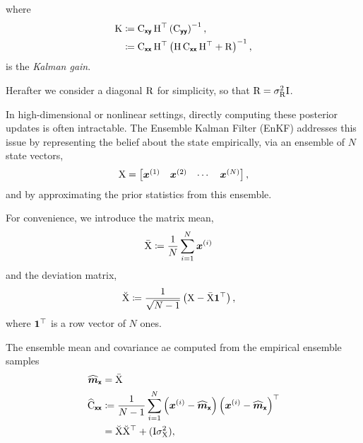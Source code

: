 \documentclass{article}
\begin{document}
where
\begin{align}
\mathrm{K}
&\coloneq \mathrm{C}_{\boldsymbol{\mathsf{xy}}}\,\mathrm{H}^\top \left(\mathrm{C}_{\boldsymbol{\mathsf{yy}}}\right)^{-1},\label{eq:kalman-gain}\\
&\coloneq \mathrm{C}_{\boldsymbol{\mathsf{xx}}}\,\mathrm{H}^\top \left(\mathrm{H}\,\mathrm{C}_{\boldsymbol{\mathsf{xx}}}\,\mathrm{H}^\top + \mathrm{R}\right)^{-1},
\end{align}
is the \emph{Kalman gain}.

Herafter we consider a diagonal \(\mathrm{R}\) for simplicity, so that \(\mathrm{R}=\sigma_{\mathrm{R}}^2\mathrm{I}\).

In high-dimensional or nonlinear settings, directly computing these posterior updates is often intractable.
The Ensemble Kalman Filter (EnKF) addresses this issue by representing the belief about the state empirically,  via an ensemble of \(N\) state vectors,
\[
\mathrm{X} = \begin{bmatrix} \boldsymbol{x}^{(1)} & \boldsymbol{x}^{(2)} & \cdots & \boldsymbol{x}^{(N)} \end{bmatrix},
\]
and by approximating the prior statistics from this ensemble.

For convenience, we introduce the  matrix mean,
\begin{align}
\bar{\mathrm{X}} &\coloneq \frac{1}{N}\sum_{i=1}^N \boldsymbol{x}^{(i)}
\end{align}
and the deviation matrix,
\begin{align}
\breve{\mathrm{X}} &\coloneq \frac{1}{\sqrt{N-1}} \left( \mathrm{X} - \bar{\mathrm{X}} \boldsymbol{1}^\top \right), \label{eq:deviation_matrix}
\end{align}
where \(\boldsymbol{1}^\top\) is a row vector of \(N\) ones.

The ensemble mean and covariance ae computed from the empirical ensemble samples
\begin{align}
\widehat{\boldsymbol{m}}_{\boldsymbol{\mathsf{x}}}
&=\bar{\mathrm{X}}\\
\widehat{\mathrm{C}}_{\boldsymbol{\mathsf{xx}}} &\coloneq \frac{1}{N-1} \sum_{i=1}^{N} \left(\boldsymbol{x}^{(i)} - \widehat{\boldsymbol{m}}_{\boldsymbol{\mathsf{x}}}\right)\left(\boldsymbol{x}^{(i)} - \widehat{\boldsymbol{m}}_{\boldsymbol{\mathsf{x}}}\right)^\top\\
&=\breve{\mathrm{X}} \breve{\mathrm{X}}^\top + (\mathrm{I}\sigma^2_{\mathrm{X}}),\label{eq:ensemble-covariance}
\end{align}
\end{document}
